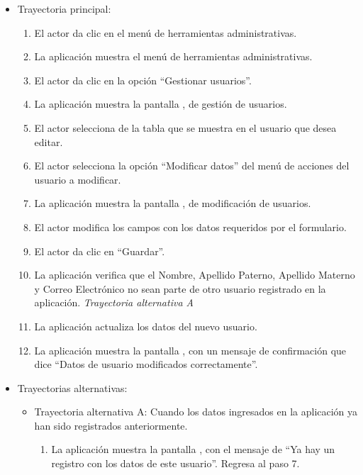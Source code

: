 			\begin{itemize}
				\item Trayectoria principal:
					\begin{enumerate}
						\item El actor da clic en el menú de herramientas administrativas.
						\item La aplicación muestra el menú de herramientas administrativas.
						\item El actor da clic en la opción ``Gestionar usuarios''.
						\item La aplicación muestra la pantalla , de gestión de usuarios.
						\item El actor selecciona de la tabla que se muestra en  el usuario que desea editar.
						\item El actor selecciona la opción ``Modificar datos'' del menú de acciones del usuario a modificar.
						\item La aplicación muestra la pantalla , de modificación de usuarios.
						\item El actor modifica los campos con los datos requeridos por el formulario.
						\item El actor da clic en ``Guardar''.
						\item La aplicación verifica que el Nombre, Apellido Paterno, Apellido Materno y Correo Electrónico no sean parte de otro usuario registrado en la aplicación. \textsl{Trayectoria alternativa A}
						\item La aplicación actualiza los datos del nuevo usuario.
						\item La aplicación muestra la pantalla , con un mensaje de confirmación que dice ``Datos de usuario modificados correctamente''.
					\end{enumerate}
				\item Trayectorias alternativas:
					\begin{itemize}
						\item Trayectoria alternativa A: Cuando los datos ingresados en la aplicación ya han sido registrados anteriormente.
							\begin{enumerate}
								\item La aplicación muestra la pantalla , con el mensaje de ``Ya hay un registro con los datos de este usuario''. Regresa al paso 7.
							\end{enumerate}
					\end{itemize}
			\end{itemize}
			
